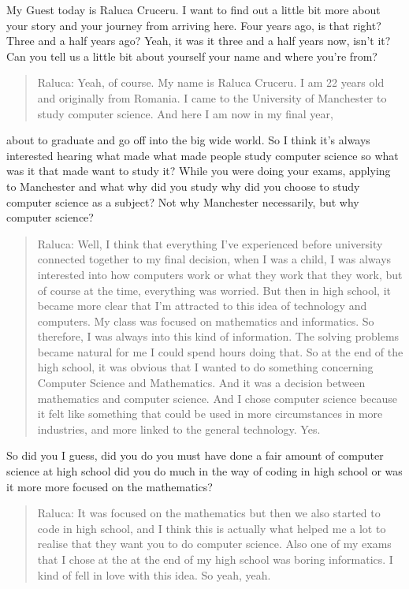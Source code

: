 \documentclass[
]{book}
\begin{document}
My Guest today is Raluca Cruceru. I want to find out a little bit more about your story and your journey from arriving here. Four years ago, is that right? Three and a half years ago? Yeah, it was it three and a half years now, isn't it? Can you tell us a little bit about yourself your name and where you're from?

\begin{quote}
Raluca: Yeah, of course. My name is Raluca Cruceru. I am 22 years old and originally from Romania. I came to the University of Manchester to study computer science. And here I am now in my final year,
\end{quote}

about to graduate and go off into the big wide world. So I think it's always interested hearing what made what made people study computer science so what was it that made want to study it? While you were doing your exams, applying to Manchester and what why did you study why did you choose to study computer science as a subject? Not why Manchester necessarily, but why computer science?

\begin{quote}
Raluca: Well, I think that everything I've experienced before university connected together to my final decision, when I was a child, I was always interested into how computers work or what they work that they work, but of course at the time, everything was worried. But then in high school, it became more clear that I'm attracted to this idea of technology and computers. My class was focused on mathematics and informatics. So therefore, I was always into this kind of information. The solving problems became natural for me I could spend hours doing that. So at the end of the high school, it was obvious that I wanted to do something concerning Computer Science and Mathematics. And it was a decision between mathematics and computer science. And I chose computer science because it felt like something that could be used in more circumstances in more industries, and more linked to the general technology. Yes.
\end{quote}

So did you I guess, did you do you must have done a fair amount of computer science at high school did you do much in the way of coding in high school or was it more more focused on the mathematics?

\begin{quote}
Raluca: It was focused on the mathematics but then we also started to code in high school, and I think this is actually what helped me a lot to realise that they want you to do computer science. Also one of my exams that I chose at the at the end of my high school was boring informatics. I kind of fell in love with this idea. So yeah, yeah.
\end{quote}
\end{document}
